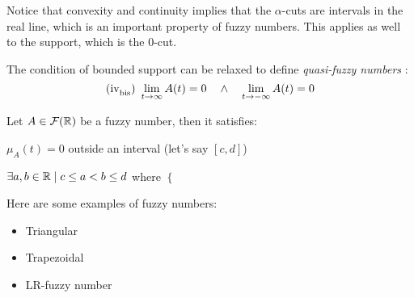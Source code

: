 \begin{remark}
    Notice that convexity and continuity implies that the $\alpha$-cuts are intervals in the real line, which is an important property of fuzzy numbers. This applies as well to the support, which is the $0$-cut.
\end{remark}

\begin{note}
The condition of bounded support can be relaxed to define \textit{quasi-fuzzy numbers} :
$$\textnormal{(iv}_{\textnormal{bis}}\textnormal{) } \lim{t}{\infty}A(t) = 0 \quad \land \quad \lim{t}{-\infty}A(t) = 0$$
\end{note}



\begin{proposition}
    Let $A\in \fuzzy{\R}$ be a fuzzy number, then it satisfies:
    \begin{romanenum}
        \item $\mu_A(t)=0$ outside an interval (let's say $[c,d]$)
        \item $\exists a,b \in \R \mid c\leq a < b \leq d$ where $\begin{cases}
            
        \end{cases}$
    \end{romanenum}
\end{proposition}


\begin{example}Here are some examples of fuzzy numbers:
    \begin{itemize}
        \item Triangular
        \item Trapezoidal
        \item LR-fuzzy number
    \end{itemize}
    
\end{example}

